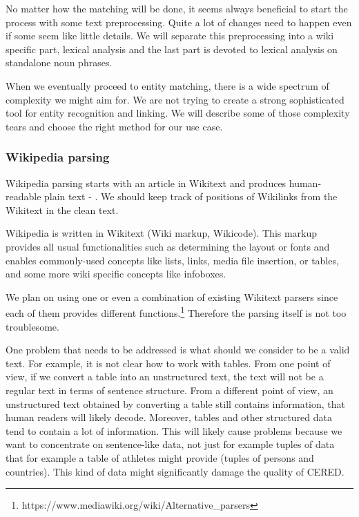 No matter how the matching will be done, it seems always beneficial to start the process with some text preprocessing. Quite a lot of changes need to happen even if some seem like little details. We will separate this preprocessing into a wiki specific part, lexical analysis and the last part is devoted to lexical analysis on standalone noun phrases.

When we eventually proceed to entity matching, there is a wide spectrum of complexity we might aim for. We are not trying to create a strong sophisticated tool for entity recognition and linking. We will describe some of those complexity tears and choose the right method for our use case.



 

\subsubsection{Wikipedia parsing}

Wikipedia parsing starts with an article in Wikitext and produces human-readable plain text - . We should keep track of positions of Wikilinks from the Wikitext in the clean text.

Wikipedia is written in Wikitext (Wiki markup, Wikicode). This markup provides all usual functionalities such as determining the layout or fonts and enables commonly-used concepts like lists, links, media file insertion, or tables, and some more wiki specific concepts like infoboxes.

We plan on using one or even a combination of existing Wikitext parsers since each of them provides different functions.\footnote{https://www.mediawiki.org/wiki/Alternative\_parsers} Therefore the parsing itself is not too troublesome. 

One problem that needs to be addressed is what should we consider to be a valid text. For example, it is not clear how to work with tables. From one point of view, if we convert a table into an unstructured text, the text will not be a regular text in terms of sentence structure. From a different point of view, an unstructured text obtained by converting a table still contains information, that human readers will likely decode. Moreover, tables and other structured data tend to contain a lot of information. This will likely cause problems because we want to concentrate on sentence-like data, not just for example tuples of data that for example a table of athletes might provide (tuples of persons and countries). This kind of data might significantly damage the quality of CERED.

